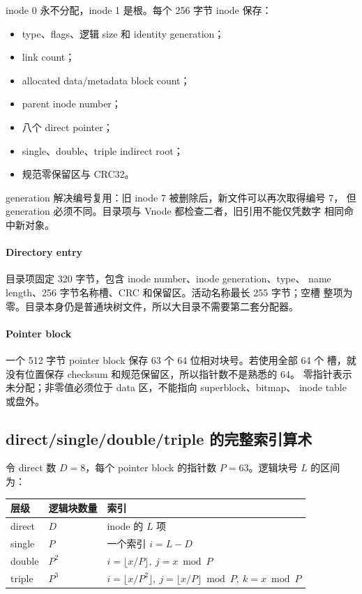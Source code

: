 inode 0 永不分配，inode 1 是根。每个 256 字节 inode 保存：

\begin{itemize}
  \item type、flags、逻辑 size 和 identity generation；
  \item link count；
  \item allocated data/metadata block count；
  \item parent inode number；
  \item 八个 direct pointer；
  \item single、double、triple indirect root；
  \item 规范零保留区与 CRC32。
\end{itemize}

generation 解决编号复用：旧 inode 7 被删除后，新文件可以再次取得编号 7，
但 generation 必须不同。目录项与 Vnode 都检查二者，旧引用不能仅凭数字
相同命中新对象。

\paragraph{Directory entry}

目录项固定 320 字节，包含 inode number、inode generation、type、
name length、256 字节名称槽、CRC 和保留区。活动名称最长 255 字节；空槽
整项为零。目录本身仍是普通块树文件，所以大目录不需要第二套分配器。

\paragraph{Pointer block}

一个 512 字节 pointer block 保存 63 个 64 位相对块号。若使用全部 64 个
槽，就没有位置保存 checksum 和规范保留区，所以指针数不是熟悉的 64。
零指针表示未分配；非零值必须位于 data 区，不能指向 superblock、bitmap、
inode table 或盘外。

\subsection{direct/single/double/triple 的完整索引算术}

令 direct 数 \(D=8\)，每个 pointer block 的指针数 \(P=63\)。逻辑块号
\(L\) 的区间为：

\begin{longtable}{L{0.23\textwidth}L{0.23\textwidth}L{0.42\textwidth}}
\toprule
层级 & 逻辑块数量 & 索引\\
\midrule
direct & \(D\) & inode 的 \(L\) 项\\
single & \(P\) & 一个索引 \(i=L-D\)\\
double & \(P^2\) & \(i=\lfloor x/P\rfloor,\ j=x\bmod P\)\\
triple & \(P^3\) &
\(i=\lfloor x/P^2\rfloor,\ j=\lfloor x/P\rfloor\bmod P,\ k=x\bmod P\)\\
\bottomrule
\end{longtable}

